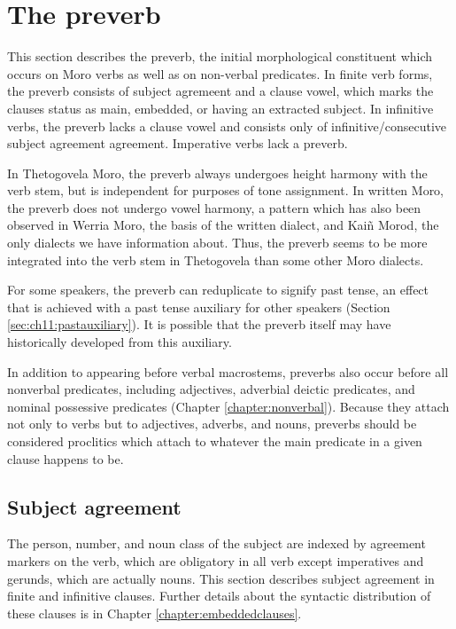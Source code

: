 \section{The preverb}\label{sec:ch11:preverb}

This section describes the preverb, the initial morphological constituent which occurs on Moro verbs as well as on non-verbal predicates. In finite verb forms, the preverb consists of subject agremeent and a clause vowel, which marks the clauses status as main, embedded, or having an extracted subject. In infinitive verbs, the preverb lacks a clause vowel and consists only of infinitive/consecutive subject agreement agreement. Imperative verbs lack a preverb. 

In Thetogovela Moro, the preverb always undergoes height harmony with the verb stem, but is independent for purposes of tone assignment. In written Moro, the preverb does not undergo vowel harmony, a pattern which has also been observed in Werria Moro, the basis of the written dialect, and Kai\~n Morod, the only dialects we have information about. Thus, the preverb seems to be more integrated into the verb stem in Thetogovela than some other Moro dialects. %

For some speakers, the preverb can reduplicate to signify past tense, an effect that is achieved with a past tense auxiliary for other speakers (Section \ref{sec:ch11:pastauxiliary}). It is possible that the preverb itself may have historically developed from this auxiliary.

In addition to appearing before verbal macrostems, preverbs also occur before all nonverbal predicates, including adjectives, adverbial deictic predicates, and nominal possessive predicates (Chapter \ref{chapter:nonverbal}). Because they attach not only to verbs but to adjectives, adverbs, and nouns, preverbs should be considered proclitics which attach to whatever the main predicate in a given clause happens to be.

\subsection{Subject agreement}\label{sec:ch11:subjectagreement}

The person, number, and noun class of the subject are indexed by agreement markers on the verb, which are obligatory in all verb except imperatives and gerunds, which are actually nouns. This section describes subject agreement in finite and infinitive clauses. Further details about the syntactic distribution of these clauses is in Chapter \ref{chapter:embeddedclauses}.

